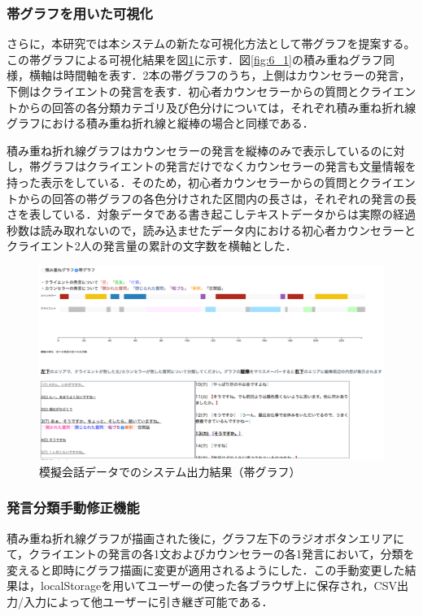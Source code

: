 \documentclass[shuuron]{kuee}
\begin{document}
\subsubsection{帯グラフを用いた可視化}

さらに，本研究では本システムの新たな可視化方法として帯グラフを提案する。この帯グラフによる可視化結果を図\ref{fig:obi}に示す．図\ref{fig:6_1}の積み重ねグラフ同様，横軸は時間軸を表す．2本の帯グラフのうち，上側はカウンセラーの発言，下側はクライエントの発言を表す．初心者カウンセラーからの質問とクライエントからの回答の各分類カテゴリ及び色分けについては，それぞれ積み重ね折れ線グラフにおける積み重ね折れ線と縦棒の場合と同様である．

積み重ね折れ線グラフはカウンセラーの発言を縦棒のみで表示しているのに対し，帯グラフはクライエントの発言だけでなくカウンセラーの発言も文量情報を持った表示をしている．そのため，初心者カウンセラーからの質問とクライエントからの回答の帯グラフの各色分けされた区間内の長さは，それぞれの発言の長さを表している．対象データである書き起こしテキストデータからは実際の経過秒数は読み取れないので，読み込ませたデータ内における初心者カウンセラーとクライエント2人の発言量の累計の文字数を横軸とした．

\begin{figure}
  \begin{center}
    \includegraphics[width=\linewidth]{obi.png}
  \end{center}
  \caption{模擬会話データでのシステム出力結果（帯グラフ）}
  \label{fig:obi}
\end{figure}

\subsubsection{発言分類手動修正機能}
積み重ね折れ線グラフが描画された後に，グラフ左下のラジオボタンエリアにて，クライエントの発言の各1文およびカウンセラーの各1発言において，分類を変えると即時にグラフ描画に変更が適用されるようにした．この手動変更した結果は，localStorageを用いてユーザーの使った各ブラウザ上に保存され，CSV出力/入力によって他ユーザーに引き継ぎ可能である．
\end{document}
